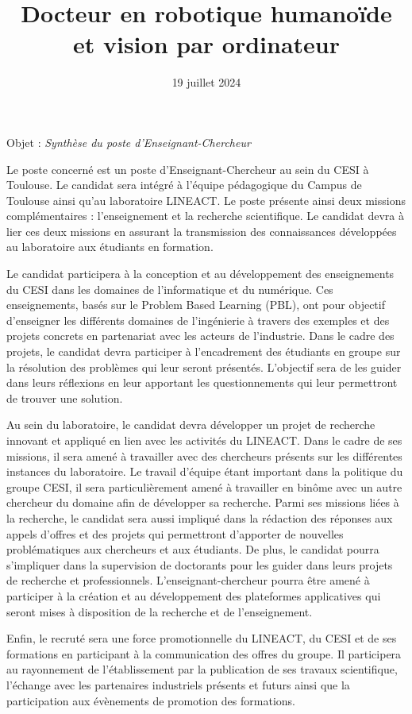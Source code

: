 \documentclass[10pt, a4paper, roman]{moderncv}        %
\title{Docteur en robotique humano\"ide et vision par ordinateur}            %
\begin{document}
\date{19 juillet 2024}
\opening{Objet : \emph{Synthèse du poste d'Enseignant-Chercheur}}
\makelettertitle
\justifying

Le poste concerné est un poste d'Enseignant-Chercheur au sein du CESI à Toulouse.
Le candidat sera intégré à l'équipe pédagogique du Campus de Toulouse ainsi qu'au laboratoire LINEACT.
Le poste présente ainsi deux missions complémentaires : l'enseignement et la recherche scientifique.
Le candidat devra à lier ces deux missions en assurant la transmission des connaissances développées au laboratoire aux étudiants en formation.

Le candidat participera à la conception et au développement des enseignements du CESI dans les domaines de l'informatique et du numérique.
Ces enseignements, basés sur le Problem Based Learning (PBL), ont pour objectif d'enseigner les différents domaines de l'ingénierie à travers des exemples et des projets concrets en partenariat avec les acteurs de l'industrie.
Dans le cadre des projets, le candidat devra participer à l'encadrement des étudiants en groupe sur la résolution des problèmes qui leur seront présentés.
L'objectif sera de les guider dans leurs réflexions en leur apportant les questionnements qui leur permettront de trouver une solution.

Au sein du laboratoire, le candidat devra développer un projet de recherche innovant et appliqué en lien avec les activités du LINEACT.
Dans le cadre de ses missions, il sera amené à travailler avec des chercheurs présents sur les différentes instances du laboratoire.
Le travail d'équipe étant important dans la politique du groupe CESI, il sera particulièrement amené à travailler en binôme avec un autre chercheur du domaine afin de développer sa recherche.
Parmi ses missions liées à la recherche, le candidat sera aussi impliqué dans la rédaction des réponses aux appels d'offres et des projets qui permettront d'apporter de nouvelles problématiques aux chercheurs et aux étudiants.
De plus, le candidat pourra s'impliquer dans la supervision de doctorants pour les guider dans leurs projets de recherche et professionnels.
L'enseignant-chercheur pourra être amené à participer à la création et au développement des plateformes applicatives qui seront mises à disposition de la recherche et de l'enseignement.

Enfin, le recruté sera une force promotionnelle du LINEACT, du CESI et de ses formations en participant à la communication des offres du groupe.
Il participera au rayonnement de l'établissement par la publication de ses travaux scientifique, l'échange avec les partenaires industriels présents et futurs ainsi que la participation aux évènements de promotion des formations.

\vspace{0.5cm}

\end{document}
